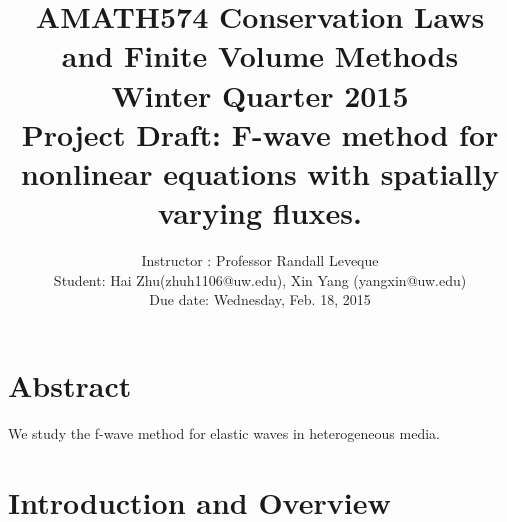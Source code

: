 \documentclass{article}
\begin{document}
\title{AMATH574 Conservation Laws and Finite Volume Methods\\ Winter Quarter 2015\\ Project Draft: F-wave method for nonlinear equations with spatially varying fluxes.}
\author{Instructor : Professor Randall Leveque\\ Student: Hai Zhu(zhuh1106@uw.edu), Xin Yang (yangxin@uw.edu)\\ Due date: Wednesday, Feb. 18, 2015}
\maketitle

\section{Abstract}
We study the f-wave method for elastic waves in heterogeneous media.
\section{Introduction and Overview}
\end{document}

